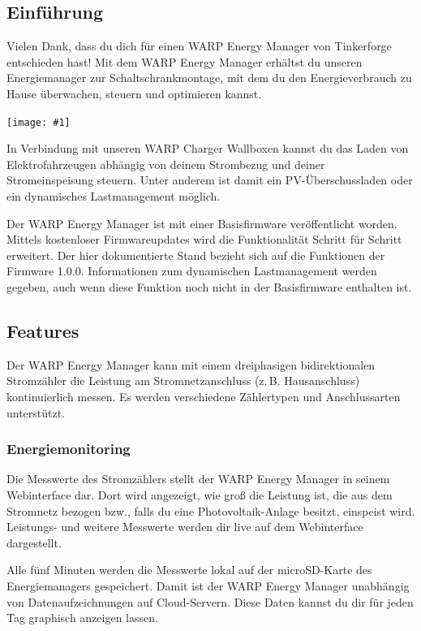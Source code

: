 \documentclass[a4paper,10pt]{article}
\newcommand{\hint}[1]{\begin{tcolorbox}[colback=boxgray,colframe=black,coltext=
white,title=Hinweis,left*=2mm,right*=2mm,boxsep=1mm,bottom=1mm,top=1mm]#1\end{tcolorbox}}
\newcommand{\gfx}[1]{\texttt{[image: \#1]}}
\begin{document}
\begin{multicols*}{2}
	\tableofcontents
	\newpage
	\section{Einführung}
	Vielen Dank, dass du dich für einen WARP Energy Manager von Tinkerforge entschieden hast!
	Mit dem WARP Energy Manager
	erhältst du unseren Energiemanager zur Schaltschrankmontage, mit dem du den
	Energieverbrauch zu Hause überwachen, steuern und optimieren kannst.

	\gfx{./img/resized/warp-energy-manager.png}

	In Verbindung mit unseren WARP Charger Wallboxen kannst du das Laden von
	Elektrofahrzeugen abhängig von deinem Strombezug und deiner Stromeinspeisung steuern.
	Unter anderem ist damit ein PV-Überschussladen oder ein dynamisches
	Lastmanagement möglich.

	\hint{Der WARP Energy Manager ist mit einer Basisfirmware veröffentlicht
	worden. Mittels kostenloser Firmwareupdates wird die Funktionalität Schritt
	für Schritt erweitert. Der hier dokumentierte Stand bezieht sich auf die
	Funktionen der Firmware 1.0.0. Informationen zum dynamischen Lastmanagement
	werden gegeben, auch wenn diese Funktion noch nicht in der Basisfirmware
	enthalten ist.}

	\subsection{Features}
	Der WARP Energy Manager kann mit einem dreiphasigen bidirektionalen
	Stromzähler die Leistung am Stromnetzanschluss (z.\,B. Hausanschluss) kontinuierlich
	messen. Es werden verschiedene Zählertypen und Anschlussarten unterstützt.

	\subsubsection{Energiemonitoring}
	Die Messwerte des Stromzählers stellt der WARP Energy Manager in seinem
	Webinterface dar. Dort wird angezeigt, wie groß die Leistung ist, die aus dem Stromnetz
	bezogen bzw., falls du eine Photovoltaik-Anlage besitzt, einspeist wird.
	Leistungs- und weitere Messwerte werden dir live auf dem Webinterface dargestellt.

	Alle fünf Minuten werden die Messwerte lokal auf der microSD-Karte des
	Energiemanagers gespeichert. Damit ist der WARP Energy Manager unabhängig
	von Datenaufzeichnungen auf Cloud-Servern. Diese Daten kannst du dir für jeden Tag
	graphisch anzeigen lassen.


\end{multicols*}
\end{document}

